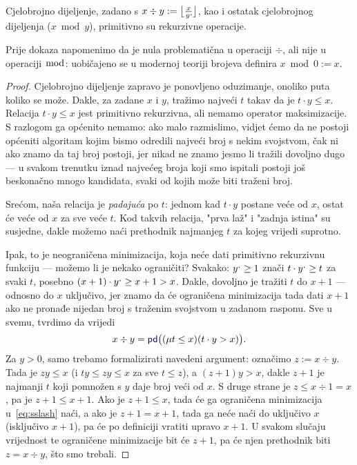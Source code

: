 \begin{propozicija}[{name=[primitivna rekurzivnost dijeljenja s ostatkom]}]\label{prop:divmodprn}
    Cjelobrojno dijeljenje, zadano s $x\div y:=\bigl\lfloor\frac{x}{y\sp{\text{\normalsize.}}\!}\bigr\rfloor$, kao i ostatak cjelobrojnog dijeljenja ($x\bmod y$), primitivno su rekurzivne operacije.
\end{propozicija}
Prije dokaza napomenimo da je nula problematična u operaciji $\div$, ali nije u operaciji $\bmod$: uobičajeno se u modernoj teoriji brojeva definira $x\bmod 0:=x$.
\begin{proof}
Cjelobrojno dijeljenje zapravo je ponovljeno oduzimanje, onoliko puta koliko se može. Dakle, za zadane $x$ i $y$, tražimo najveći $t$ takav da je $t\cdot y\le x$. Relacija $t\cdot y\le x$ jest primitivno rekurzivna, ali nemamo operator maksimizacije. S razlogom ga općenito nemamo: ako malo razmislimo, vidjet ćemo da ne postoji općeniti algoritam kojim bismo odredili najveći broj s nekim svojstvom, čak ni ako znamo da taj broj postoji, jer nikad ne znamo jesmo li tražili dovoljno dugo --- u svakom trenutku iznad najvećeg broja koji smo ispitali postoji još beskonačno mnogo kandidata, svaki od kojih može biti traženi broj.

Srećom, naša relacija je \emph{padajuća} po $t$: jednom kad $t\cdot y$ postane veće od $x$, ostat će veće od $x$ za sve veće $t$. Kod takvih relacija, "prva laž" i "zadnja istina" su susjedne, dakle možemo naći prethodnik najmanjeg $t$ za kojeg vrijedi suprotno.

Ipak, to je neograničena minimizacija, koja neće dati primitivno rekurzivnu funkciju --- možemo li je nekako ograničiti? Svakako: $y\sp{\text{\normalsize.}}\ge 1$ znači $t\cdot y\sp{\text{\normalsize.}}\ge t$ za svaki $t$, posebno $(x+1)\cdot y\sp{\text{\normalsize.}}\ge x+1>x$. Dakle, dovoljno je tražiti $t$ do $x+1$ --- odnosno do $x$ uključivo, jer znamo da će ograničena minimizacija tada dati $x+1$ ako ne pronađe nijedan broj s traženim svojstvom u zadanom rasponu. Sve u svemu, tvrdimo da vrijedi
\begin{equation}\label{eq:sslash}
    x\div y=\f{pd}\bigl((\mu t\le x)(t\cdot y>x)\bigr)\text.
\end{equation}
Za $y>0$, samo trebamo formalizirati navedeni argument: označimo $z:=x\div y$. Tada je $zy\le x$ (i $ty\le zy\le x$ za sve $t\le z$), a $(z+1)y>x$, dakle $z+1$ je najmanji $t$ koji pomnožen s $y$ daje broj veći od $x$. S druge strane je $z\le x\div1=x$, pa je $z+1\le x+1$. Ako je $z+1\le x$, tada će ga ograničena minimizacija u~\eqref{eq:sslash} naći, a ako je $z+1=x+1$, tada ga neće naći do uključivo $x$ (isključivo $x+1$), pa će po definiciji vratiti upravo $x+1$. U svakom slučaju vrijednost te ograničene minimizacije bit će $z+1$, pa će njen prethodnik biti $z=x\div y$, što smo trebali.


\end{proof}
